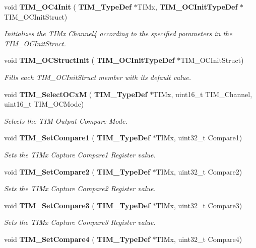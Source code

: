 \begin{DoxyCompactItemize}
void \textbf{ T\+I\+M\+\_\+\+O\+C4\+Init} (\textbf{ T\+I\+M\+\_\+\+Type\+Def} $\ast$T\+I\+Mx, \textbf{ T\+I\+M\+\_\+\+O\+C\+Init\+Type\+Def} $\ast$T\+I\+M\+\_\+\+O\+C\+Init\+Struct)
\begin{DoxyCompactList}\small\item\em Initializes the T\+I\+Mx Channel4 according to the specified parameters in the T\+I\+M\+\_\+\+O\+C\+Init\+Struct. \end{DoxyCompactList}\item 
void \textbf{ T\+I\+M\+\_\+\+O\+C\+Struct\+Init} (\textbf{ T\+I\+M\+\_\+\+O\+C\+Init\+Type\+Def} $\ast$T\+I\+M\+\_\+\+O\+C\+Init\+Struct)
\begin{DoxyCompactList}\small\item\em Fills each T\+I\+M\+\_\+\+O\+C\+Init\+Struct member with its default value. \end{DoxyCompactList}\item 
void \textbf{ T\+I\+M\+\_\+\+Select\+O\+CxM} (\textbf{ T\+I\+M\+\_\+\+Type\+Def} $\ast$T\+I\+Mx, uint16\+\_\+t T\+I\+M\+\_\+\+Channel, uint16\+\_\+t T\+I\+M\+\_\+\+O\+C\+Mode)
\begin{DoxyCompactList}\small\item\em Selects the T\+IM Output Compare Mode. \end{DoxyCompactList}\item 
void \textbf{ T\+I\+M\+\_\+\+Set\+Compare1} (\textbf{ T\+I\+M\+\_\+\+Type\+Def} $\ast$T\+I\+Mx, uint32\+\_\+t Compare1)
\begin{DoxyCompactList}\small\item\em Sets the T\+I\+Mx Capture Compare1 Register value. \end{DoxyCompactList}\item 
void \textbf{ T\+I\+M\+\_\+\+Set\+Compare2} (\textbf{ T\+I\+M\+\_\+\+Type\+Def} $\ast$T\+I\+Mx, uint32\+\_\+t Compare2)
\begin{DoxyCompactList}\small\item\em Sets the T\+I\+Mx Capture Compare2 Register value. \end{DoxyCompactList}\item 
void \textbf{ T\+I\+M\+\_\+\+Set\+Compare3} (\textbf{ T\+I\+M\+\_\+\+Type\+Def} $\ast$T\+I\+Mx, uint32\+\_\+t Compare3)
\begin{DoxyCompactList}\small\item\em Sets the T\+I\+Mx Capture Compare3 Register value. \end{DoxyCompactList}\item 
void \textbf{ T\+I\+M\+\_\+\+Set\+Compare4} (\textbf{ T\+I\+M\+\_\+\+Type\+Def} $\ast$T\+I\+Mx, uint32\+\_\+t Compare4)

\end{DoxyCompactItemize}

